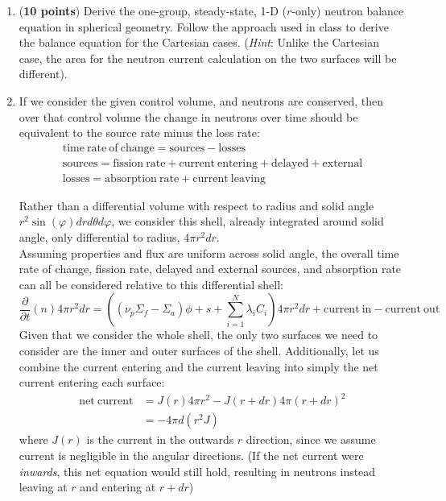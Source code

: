 \documentclass[11pt]{article}
\newcommand{\ans}[1]{{\color{violet}#1}}
\newcommand{\ddt}{\frac{\partial}{\partial t}}
\begin{document}
\begin{enumerate}
\item[(a)] ({\bf 10 points}) Derive the one-group, steady-state, 1-D ($r$-only) neutron balance equation in spherical geometry. Follow the approach used in class to derive the balance equation for the Cartesian cases. ({\it Hint}: Unlike the Cartesian case, the area for the neutron current calculation on the two surfaces will be different).
\item[] \ans{
    If we consider the given control volume, and neutrons are conserved, then over that control volume the change in neutrons over time should be equivalent to the source rate minus the loss rate:
    \begin{gather*}
        \mathrm{time~rate~of~change=sources-losses}\\
        \mathrm{sources=fission~rate+current~entering+delayed+external}\\
        \mathrm{losses=absorption~rate+current~leaving}
    \end{gather*}

    Rather than a differential volume with respect to radius and solid angle $ r^2\sin(\varphi)d r d\theta d\varphi$, we consider this shell, already integrated around solid angle, only differential to radius, $4\pi r^2d r$.\\
    Assuming properties and flux are uniform across solid angle, the overall time rate of change, fission rate, delayed and external sources, and absorption rate can all be considered relative to this differential shell:
    \begin{equation*}
        \ddt(n)4\pi r^2d r = \left((\nu_p\Sigma_f-\Sigma_a)\phi + s + \sum_{i=1}^{N}\lambda_iC_i\right)4\pi r^2d r + \mathrm{current~in-current~out}
    \end{equation*}
    Given that we consider the whole shell, the only two surfaces we need to consider are the inner and outer surfaces of the shell.
    Additionally, let us combine the current entering and the current leaving into simply the net current entering each surface:
    \begin{align*}
        \mathrm{net~current}&=J(r)4\pi r^2-J(r+dr)4\pi (r+dr)^2\\
        &=-4\pi d(r^2J)
    \end{align*}
    where $J(r)$ is the current in the outwards $\hat{r}$ direction, since we assume current is negligible in the angular directions. (If the net current were \emph{inwards}, this net equation would still hold, resulting in neutrons instead leaving at $r$ and entering at $r+dr$)\\

}
\end{enumerate}
\end{document}
